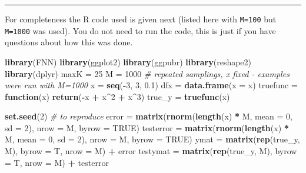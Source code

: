 \documentclass[]{article}
\newenvironment{Shaded}{\begin{snugshade}}{\end{snugshade}}
\newcommand{\CommentTok}[1]{\textcolor[rgb]{0.56,0.35,0.01}{\textit{#1}}}
\newcommand{\ControlFlowTok}[1]{\textcolor[rgb]{0.13,0.29,0.53}{\textbf{#1}}}
\newcommand{\DataTypeTok}[1]{\textcolor[rgb]{0.13,0.29,0.53}{#1}}
\newcommand{\DecValTok}[1]{\textcolor[rgb]{0.00,0.00,0.81}{#1}}
\newcommand{\FloatTok}[1]{\textcolor[rgb]{0.00,0.00,0.81}{#1}}
\newcommand{\KeywordTok}[1]{\textcolor[rgb]{0.13,0.29,0.53}{\textbf{#1}}}
\newcommand{\NormalTok}[1]{#1}
\newcommand{\OperatorTok}[1]{\textcolor[rgb]{0.81,0.36,0.00}{\textbf{#1}}}
\newcommand{\OtherTok}[1]{\textcolor[rgb]{0.56,0.35,0.01}{#1}}
\newcommand{\StringTok}[1]{\textcolor[rgb]{0.31,0.60,0.02}{#1}}
\begin{document}
\begin{center}\rule{0.5\linewidth}{\linethickness}\end{center}

For completeness the R code used is given next (listed here with
\texttt{M=100} but \texttt{M=1000} was used). You do not need to run the
code, this is just if you have questions about how this was done.

\footnotesize

\begin{Shaded}
\begin{Highlighting}[]
\KeywordTok{library}\NormalTok{(FNN)}
\KeywordTok{library}\NormalTok{(ggplot2)}
\KeywordTok{library}\NormalTok{(ggpubr)}
\KeywordTok{library}\NormalTok{(reshape2)}
\KeywordTok{library}\NormalTok{(dplyr)}
\NormalTok{maxK =}\StringTok{ }\DecValTok{25}
\NormalTok{M =}\StringTok{ }\DecValTok{1000}  \CommentTok{# repeated samplings, x fixed  - examples were run with M=1000}
\NormalTok{x =}\StringTok{ }\KeywordTok{seq}\NormalTok{(}\OperatorTok{-}\DecValTok{3}\NormalTok{, }\DecValTok{3}\NormalTok{, }\FloatTok{0.1}\NormalTok{)}
\NormalTok{dfx =}\StringTok{ }\KeywordTok{data.frame}\NormalTok{(}\DataTypeTok{x =}\NormalTok{ x)}
\NormalTok{truefunc =}\StringTok{ }\ControlFlowTok{function}\NormalTok{(x) }\KeywordTok{return}\NormalTok{(}\OperatorTok{-}\NormalTok{x }\OperatorTok{+}\StringTok{ }\NormalTok{x}\OperatorTok{^}\DecValTok{2} \OperatorTok{+}\StringTok{ }\NormalTok{x}\OperatorTok{^}\DecValTok{3}\NormalTok{)}
\NormalTok{true_y =}\StringTok{ }\KeywordTok{truefunc}\NormalTok{(x)}

\KeywordTok{set.seed}\NormalTok{(}\DecValTok{2}\NormalTok{)  }\CommentTok{# to reproduce}
\NormalTok{error =}\StringTok{ }\KeywordTok{matrix}\NormalTok{(}\KeywordTok{rnorm}\NormalTok{(}\KeywordTok{length}\NormalTok{(x) }\OperatorTok{*}\StringTok{ }\NormalTok{M, }\DataTypeTok{mean =} \DecValTok{0}\NormalTok{, }\DataTypeTok{sd =} \DecValTok{2}\NormalTok{), }\DataTypeTok{nrow =}\NormalTok{ M, }\DataTypeTok{byrow =} \OtherTok{TRUE}\NormalTok{)}
\NormalTok{testerror =}\StringTok{ }\KeywordTok{matrix}\NormalTok{(}\KeywordTok{rnorm}\NormalTok{(}\KeywordTok{length}\NormalTok{(x) }\OperatorTok{*}\StringTok{ }\NormalTok{M, }\DataTypeTok{mean =} \DecValTok{0}\NormalTok{, }\DataTypeTok{sd =} \DecValTok{2}\NormalTok{), }\DataTypeTok{nrow =}\NormalTok{ M, }
    \DataTypeTok{byrow =} \OtherTok{TRUE}\NormalTok{)}
\NormalTok{ymat =}\StringTok{ }\KeywordTok{matrix}\NormalTok{(}\KeywordTok{rep}\NormalTok{(true_y, M), }\DataTypeTok{byrow =}\NormalTok{ T, }\DataTypeTok{nrow =}\NormalTok{ M) }\OperatorTok{+}\StringTok{ }\NormalTok{error}
\NormalTok{testymat =}\StringTok{ }\KeywordTok{matrix}\NormalTok{(}\KeywordTok{rep}\NormalTok{(true_y, M), }\DataTypeTok{byrow =}\NormalTok{ T, }\DataTypeTok{nrow =}\NormalTok{ M) }\OperatorTok{+}\StringTok{ }\NormalTok{testerror}


\end{Highlighting}
\end{Shaded}
\end{document}
